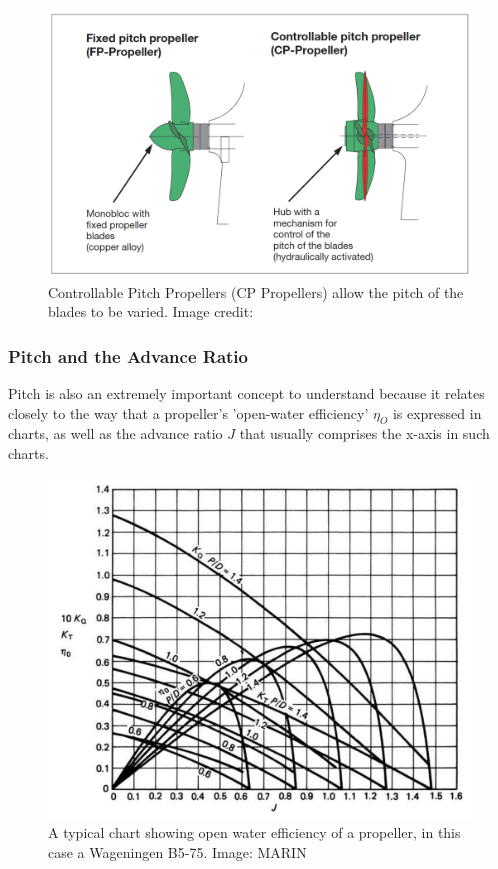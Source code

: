 \documentclass{article}\usepackage[]{graphicx}\usepackage[]{color}
\begin{document}
\begin{figure}
\includegraphics[width=\textwidth]{CPPropeller.png}
\caption{Controllable Pitch Propellers (CP Propellers) allow the pitch of the blades to be varied. Image credit: \parencite{mollard2011}}
\label{fig:CPPropeller.png}
\end{figure}

\subsubsection{Pitch and the Advance Ratio}
Pitch is also an extremely important concept to understand because it relates closely to the way that a propeller's 'open-water efficiency' $\eta_O$ is expressed in charts, as well as the advance ratio $J$ that usually comprises the x-axis in such charts.

\begin{figure}
\includegraphics[width=\textwidth]{OpenWater.png}
\caption{A typical chart showing open water efficiency of a propeller, in this case a Wageningen B5-75. Image: MARIN}
\label{fig:OpenWater.png}
\end{figure}
\end{document}
